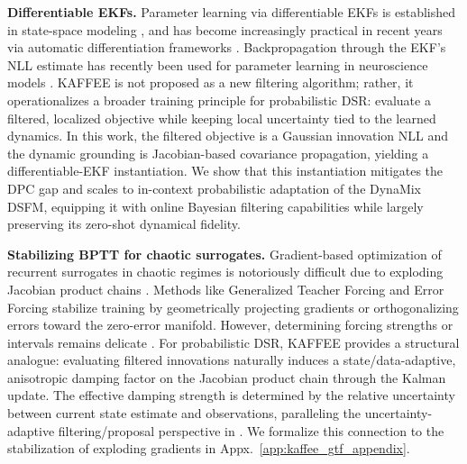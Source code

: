 \documentclass{article}
\theoremstyle{plain}
\theoremstyle{definition}
\theoremstyle{remark}
\begin{document}
\textbf{Differentiable EKFs.} Parameter learning via differentiable EKFs is established in state-space modeling \cite{gupta1974computational,kokkala2016sigmapoint, sarkka2023bayesian}, and has become increasingly practical in recent years via automatic differentiation frameworks \cite{gorad2020parameter, haarnoja2016backprop}. Backpropagation through the EKF’s NLL estimate has recently been used for parameter learning in neuroscience models \cite{tanoh2026identifying}. KAFFEE is not proposed as a new filtering algorithm; rather, it operationalizes a broader training principle for probabilistic DSR: evaluate a filtered, localized objective while keeping local uncertainty tied to the learned dynamics. In this work, the filtered objective is a Gaussian innovation NLL and the dynamic grounding is Jacobian-based covariance propagation, yielding a differentiable-EKF instantiation. We show that this instantiation mitigates the DPC gap and scales to in-context probabilistic adaptation of the DynaMix DSFM, equipping it with online Bayesian filtering capabilities while largely preserving its zero-shot dynamical fidelity. 

\textbf{Stabilizing BPTT for chaotic surrogates.} Gradient-based optimization of recurrent surrogates in chaotic regimes is notoriously difficult due to exploding Jacobian product chains \citep{mikhaeil2022difficulty}. Methods like Generalized Teacher Forcing \citep{hess2023generalized} and Error Forcing \citep{sagtekin2025error} stabilize training by geometrically projecting gradients or orthogonalizing errors toward the zero-error manifold. However, determining forcing strengths or intervals remains delicate \citep{sip2026double}. For probabilistic DSR, KAFFEE provides a structural analogue: evaluating filtered innovations naturally induces a state/data-adaptive, anisotropic damping factor on the Jacobian product chain through the Kalman update. The effective damping strength is determined by the relative uncertainty between current state estimate and observations, paralleling the uncertainty-adaptive filtering/proposal perspective in \citep{pals2024inferring}. We formalize this connection to the stabilization of exploding gradients in Appx.~\ref{app:kaffee_gtf_appendix}.
\end{document}
